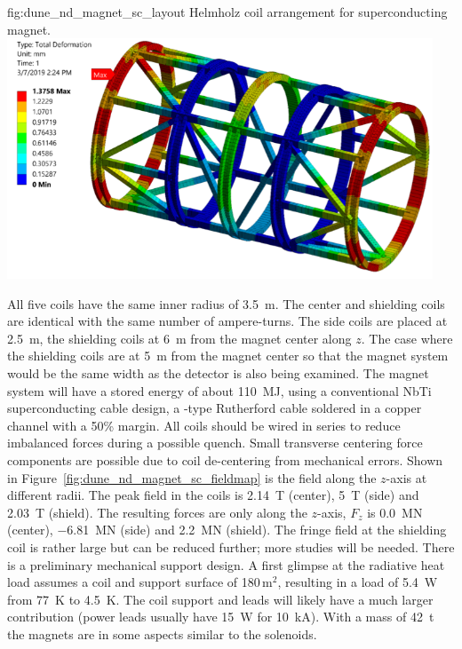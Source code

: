 \begin{dunefigure}{fig:dune_nd_magnet_sc_layout}
{Helmholz coil arrangement for  superconducting magnet.}
\includegraphics[width=0.95\textwidth]{graphics/SC_mag_st.png}
\end{dunefigure}
%
All five coils have the same inner radius of \SI{3.5}{m}. The center and shielding coils are identical with the same number of ampere-turns. The side coils are placed at \SI{2.5}{m}, the shielding coils at \SI{6}{m} from the magnet center along $z$.  The case where the shielding coils are at \SI{5}{m} from the magnet center so that the magnet system would be the same width as the   detector is also being examined.  The magnet system will have a stored energy of about \SI{110}{MJ}, using a conventional NbTi superconducting cable design, a -type Rutherford cable soldered in a copper channel with a 50\% margin. All coils should be wired in series to reduce imbalanced forces during a possible quench. Small transverse centering force components are possible due to coil de-centering from mechanical errors. 
%
Shown in Figure~\ref{fig:dune_nd_magnet_sc_fieldmap} is the field along the $z$-axis at different radii. The peak field in the coils is \SI{2.14}{T} (center), \SI{5}{T} (side) and \SI{2.03}{T} (shield). The resulting forces are only along the $z$-axis, $F_{z}$ is \SI{0.0}{MN} (center), \SI{-6.81}{MN} (side) and \SI{2.2}{MN} (shield). The fringe field at the shielding coil is rather large but can be reduced further; more studies will be needed. There is a preliminary mechanical support design. A first glimpse at the radiative heat load assumes a coil and support surface of 180\,m$^{2}$, resulting in a load of \SI{5.4}{W} from \SI{77}{K} to \SI{4.5}{K}. The coil support and leads will likely have a much larger contribution (power leads usually have \SI{15}{W} for \SI{10}{kA}). With a mass of \SI{42}{t} the magnets are in some aspects similar to the  solenoids.

